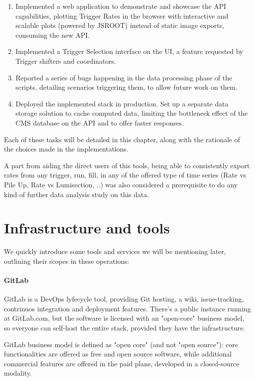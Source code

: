 \begin{enumerate}
\item Implemented a web application to demonstrate and showcase the API capabilities, plotting Trigger Rates in the browser with interactive and scalable plots (powered by JSROOT) instead of static image exports, consuming the new API.
\item Implemented a Trigger Selection interface on the UI, a feature requested by Trigger shifters and coordinators.
\item Reported a series of bugs happening in the data processing phase of the scripts, detailing scenarios triggering them, to allow future work on them.
\item Deployed the implemented stack in production. Set up a separate data storage solution to cache computed data, limiting the bottleneck effect of the CMS database on the API and to offer faster responses.

\end{enumerate}

Each of these tasks will be detailed in this chapter, along with the rationale of the choices made in the implementations.

A part from aiding the direct users of this tools, being able to consistently export rates from any trigger, run, fill, in any of the offered type of time series (Rate vs Pile Up, Rate vs Lumisection, ..) was also considered a prerequisite to do any kind of further data analysis study on this data.

\section{Infrastructure and tools}

We quickly introduce some tools and services we will be mentioning later, outlining their scopes in these operations:

\paragraph{GitLab}

GitLab is a DevOps lyfecycle tool, providing Git hosting, a wiki, issue-tracking, contrinuos integration and deployment features. There's a public instance running at GitLab.com, but the software is licensed with an "open-core" business model, so everyone can self-host the entire stack, provided they have the infrastructure.

GitLab business model is defined as "open core" (and not "open source"): core functionalities are offered as free and open source software, while additional commercial features are offered in the paid plans, developed in a closed-source modality.


